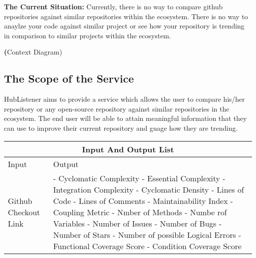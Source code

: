 \documentclass{article}
\begin{document}
\textbf{The Current Situation:} 
Currently, there is no way to compare github repositories against similar repositories within the ecosystem. There is no way to anaylze your code against similar project or see how your repository is trending in comparison to similar projects within the ecosystem. 

\textbf(Context Diagram) 

\subsection{The Scope of the Service}
HubListener aims to provide a service which allows the user to compare his/her repository or any open-source repository against similar repositories in the ecosystem. The end user will  be able to attain meaningful information that they can use to improve their current repository and guage how they are trending. 
\newline

\begin{tabular}{ |p{6cm}||p{6cm}|  }
 \hline
 \multicolumn{2}{|c|}{Input And Output List} \\
 \hline
Input  & Output \\
 \hline 
Github Checkout Link & 
- Cyclomatic  Complexity \newline
- Essential Complexity \newline
- Integration Complexity \newline
- Cyclomatic Density\newline
- Lines of Code \newline
- Lines of Comments\newline
- Maintainability Index\newline
- Coupling Metric  \newline
- Nmber of Methods\newline
- Numbe rof Variables\newline 
- Number of Issues\newline
- Number of Bugs\newline
- Number of Stars\newline
- Number of possible Logical Errors\newline 
- Functional Coverage Score\newline
- Condition Coverage Score \\
\hline
\end{tabular}
\end{document}
